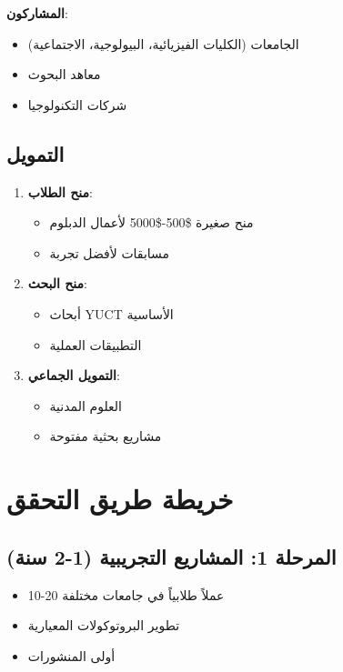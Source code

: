 \documentclass[12pt,a4paper]{article}
\begin{document}
	\textbf{المشاركون}:
	\begin{itemize}
		\item الجامعات (الكليات الفيزيائية، البيولوجية، الاجتماعية)
		\item معاهد البحوث
		\item شركات التكنولوجيا
	\end{itemize}
	
	\subsection{التمويل}
	
	\begin{enumerate}
		\item \textbf{منح الطلاب}:
		\begin{itemize}
			\item منح صغيرة \$500-\$5000 لأعمال الدبلوم
			\item مسابقات لأفضل تجربة
		\end{itemize}
		
		\item \textbf{منح البحث}:
		\begin{itemize}
			\item أبحاث YUCT الأساسية
			\item التطبيقات العملية
		\end{itemize}
		
		\item \textbf{التمويل الجماعي}:
		\begin{itemize}
			\item العلوم المدنية
			\item مشاريع بحثية مفتوحة
		\end{itemize}
	\end{enumerate}
	
	\section{خريطة طريق التحقق}
	
	\subsection{المرحلة 1: المشاريع التجريبية (1-2 سنة)}
	\begin{itemize}
		\item 10-20 عملاً طلابياً في جامعات مختلفة
		\item تطوير البروتوكولات المعيارية
		\item أولى المنشورات
	\end{itemize}
	
\end{document}
